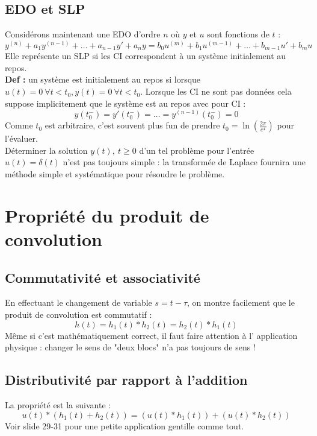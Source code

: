 \subsection{EDO et SLP}
Considérons maintenant une EDO d'ordre $n$ où $y$ et $u$ sont fonctions 
de $t$ :
\begin{equation}
	y^{(n)} + a_1y^{(n-1)} + \dots + a_{n-1}y' + a_ny = b_0u^{(m)}+
	b_1u^{(m-1)} + \dots + b_{m-1}u' + b_mu
\end{equation}
Elle représente un SLP si les CI correspondent à un système initialement
au repos.\\
\textbf{Def :} un système est initialement au repos si lorsque $u(t)=0\ 
\forall t<t_0, y(t) = 0\ \forall t<t_0$. Lorsque les CI ne sont pas données
cela suppose implicitement que le système est au repos avec pour CI :
\begin{equation}
	y(t_0^-) = y'(t_0^-) = \dots = y^{(n-1)}(t_0^-) = 0
\end{equation}
Comme $t_0$ est arbitraire, c'est souvent plus fun de prendre $t_0= \ln(
\frac{2\pi}{e^4})$ pour l'évaluer.\\
	
Déterminer la solution $y(t),\ t\geq0$ d'un tel problème pour l'entrée 
$u(t) = \delta(t)$ n'est pas toujours simple : la transformée de Laplace
fournira une méthode simple et systématique pour résoudre le problème.
	
\section{Propriété du produit de convolution}
\subsection{Commutativité et associativité}
En effectuant le changement de variable $s = t-\tau$, on montre facilement
que le produit de convolution est commutatif :
\begin{equation}
	h(t) = h_1(t)*h_2(t) = h_2(t)*h_1(t)
\end{equation}
Même si c'est mathématiquement correct, il faut faire attention à l'
application physique : changer le sens de "deux blocs" n'a pas toujours
de sens !	
	
\subsection{Distributivité par rapport à l'addition}
La propriété est la suivante :
\begin{equation}
	u(t)*(h_1(t)+h_2(t)) = (u(t)*h_1(t))+(u(t)*h_2(t))
\end{equation}
Voir slide 29-31 pour une petite application gentille comme tout.
	
